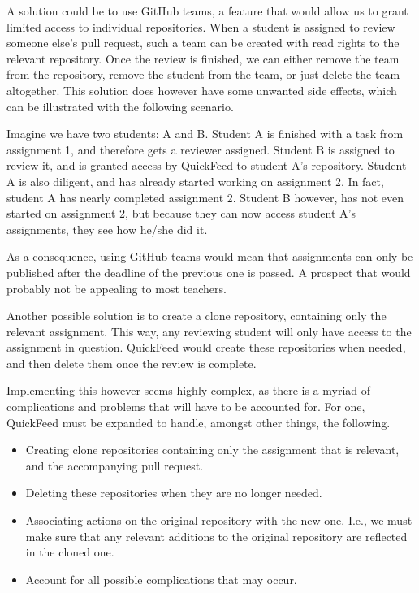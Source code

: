 A solution could be to use GitHub teams, a feature that would allow us to grant limited access to individual repositories.
When a student is assigned to review someone else's pull request, such a team can be created with read rights to the relevant repository.
Once the review is finished, we can either remove the team from the repository, remove the student from the team, or just delete the team altogether.
This solution does however have some unwanted side effects, which can be illustrated with the following scenario.

Imagine we have two students: A and B.
Student A is finished with a task from assignment 1, and therefore gets a reviewer assigned.
Student B is assigned to review it, and is granted access by QuickFeed to student A's repository.
Student A is also diligent, and has already started working on assignment 2.
In fact, student A has nearly completed assignment 2.
Student B however, has not even started on assignment 2, but because they can now access student A's assignments, they see how he/she did it.

As a consequence, using GitHub teams would mean that assignments can only be published after the deadline of the previous one is passed.
A prospect that would probably not be appealing to most teachers.

Another possible solution is to create a clone repository, containing only the relevant assignment. 
This way, any reviewing student will only have access to the assignment in question.
QuickFeed would create these repositories when needed, and then delete them once the review is complete.

Implementing this however seems highly complex, as there is a myriad of complications and problems that will have to be accounted for.
For one, QuickFeed must be expanded to handle, amongst other things, the following.

\begin{itemize}
    \item Creating clone repositories containing only the assignment that is relevant, and the accompanying pull request.
    \item Deleting these repositories when they are no longer needed.
    \item Associating actions on the original repository with the new one.
    I.e., we must make sure that any relevant additions to the original repository are reflected in the cloned one.
    \item Account for all possible complications that may occur.
\end{itemize}

